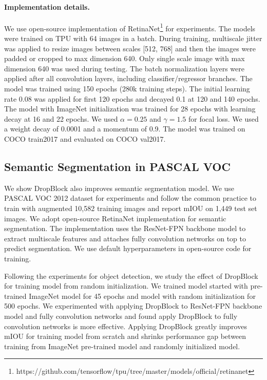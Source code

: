 \documentclass{article}
\begin{document}
\paragraph{Implementation details.}
We use open-source implementation of RetinaNet\footnote{https://github.com/tensorflow/tpu/tree/master/models/official/retinanet} for experiments. The models were trained on TPU with 64 images in a batch. During training, multiscale jitter was applied to resize images between scales [512, 768] and then the images were padded or cropped to max dimension 640. Only single scale image with max dimension 640 was used during testing. The batch normalization layers were applied after all convolution layers, including classifier/regressor branches. The model was trained using 150 epochs (280k training steps). The initial learning rate 0.08 was applied for first 120 epochs and decayed 0.1 at 120 and 140 epochs. The model with ImageNet initialization was trained for 28 epochs with learning decay at 16 and 22 epochs. We used $\alpha=0.25$ and $\gamma=1.5$ for focal loss. We used a weight decay of 0.0001 and a momentum of 0.9. The model was trained on COCO train2017 and evaluated on COCO val2017.



\subsection{Semantic Segmentation in PASCAL VOC}
We show DropBlock also improves semantic segmentation model. We use PASCAL VOC 2012 dataset for experiments and follow the common practice to train with augmented 10,582 training images \cite{vocdataset2012} and report mIOU on 1,449 test set images. We adopt open-source RetinaNet implementation for semantic segmentation. The implementation uses the ResNet-FPN backbone model to extract multiscale features and attaches fully convolution networks on top to predict segmentation. We use default hyperparameters in open-source code for training.

Following the experiments for object detection, we study the effect of DropBlock for training model from random initialization. We trained model started with pre-trained ImageNet model for 45 epochs and model with random initialization for 500 epochs. We experimented with applying DropBlock to ResNet-FPN backbone model and fully convolution networks and found apply DropBlock to fully convolution networks is more effective. Applying DropBlock greatly improves mIOU for training model from scratch and shrinks performance gap between training from ImageNet pre-trained model and randomly initialized model.
\end{document}
